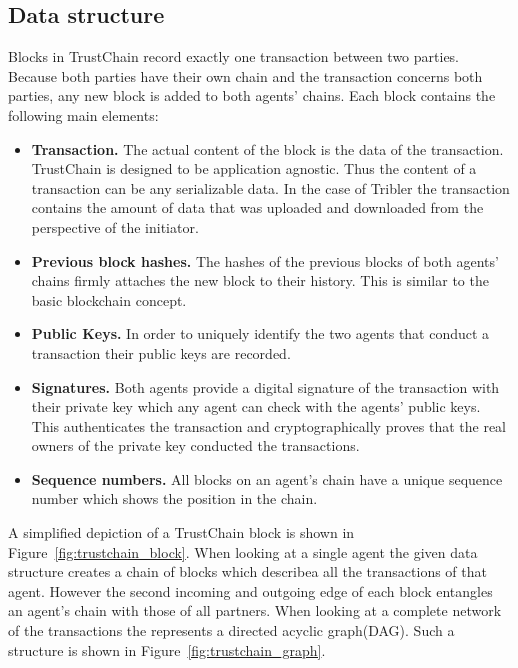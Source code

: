 \subsection{Data structure}
\label{sec:transaction_blocks}
Blocks in TrustChain record exactly one transaction between two parties. Because both parties have 
their own chain and the transaction concerns both parties, any new block is added to both agents'
chains. Each block contains the following main elements:

\begin{itemize}
    \item \textbf{Transaction.} The actual content of the block is the data of the transaction. 
    TrustChain is designed to be application agnostic. Thus the content of a transaction can be any 
    serializable data. In the case of Tribler the transaction contains the amount of data that was
    uploaded and downloaded from the perspective of the initiator.
    \item \textbf{Previous block hashes.} The hashes of the previous blocks of both agents' chains 
    firmly attaches the new block to their history. This is similar to the basic blockchain concept.
    \item \textbf{Public Keys.} In order to uniquely identify the two agents that conduct a transaction
    their public keys are recorded.
    \item \textbf{Signatures.} Both agents provide a digital signature of the transaction with their 
    private key which any agent can check with the agents' public keys. This authenticates the 
    transaction and cryptographically proves that the real owners of the private key conducted the 
    transactions.
    \item \textbf{Sequence numbers.} All blocks on an agent's chain have a unique sequence number 
    which shows the position in the chain. 
\end{itemize}

A simplified depiction of a TrustChain block is shown in Figure~\ref{fig:trustchain_block}. When 
looking at a single agent the given data structure creates a chain of blocks which describea all the
transactions of that agent. However the second incoming and outgoing edge of each block entangles an
agent's chain with those of all partners. When looking at a complete network of the transactions the
represents a directed acyclic graph(DAG). Such a structure is shown in Figure~\ref{fig:trustchain_graph}.

